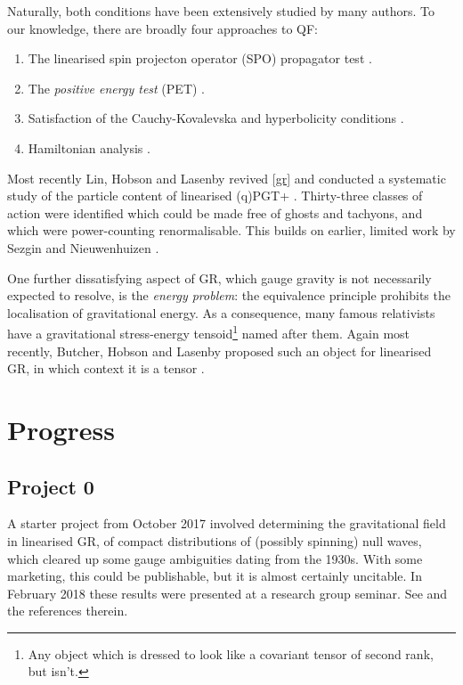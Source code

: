 \documentclass[twoside]{report}
\begin{document}
\begin{multicols}{2}
Naturally, both conditions have been extensively studied by many authors. To our knowledge, there are broadly four approaches to QF:
\begin{enumerate}[resume]
  \item\label{gr} The linearised spin projecton operator (SPO) propagator test \cite{2015CQGra..32e5012K,1980PhRvD..21.3269S}.
  \item\label{al} The \textit{positive energy test} (PET) \cite{2002IJMPD..11..747Y}.
  \item\label{be} Satisfaction of the Cauchy-Kovalevska and hyperbolicity conditions \cite{2002IJMPD..11..747Y}.
  \item\label{ga} Hamiltonian analysis \cite{2015CQGra..32e5012K,1990PhLA..151...12H,1984PhRvD..30.2508N,2018PhRvD..98b4014B,1998AcPPB..29..961C,1983PhRvD..28.2455B,1987PhRvD..35.3748B}. 
\end{enumerate}
Most recently Lin, Hobson and Lasenby revived \ref{gr} and conducted a systematic study of the particle content of linearised (q)PGT+ \cite{2019PhRvD..99f4001L,Lin2}. Thirty-three classes of action were identified which could be made free of ghosts and tachyons, and which were power-counting renormalisable. This builds on earlier, limited work by Sezgin and Nieuwenhuizen \cite{1980PhRvD..21.3269S}.

One further dissatisfying aspect of GR, which gauge gravity is not necessarily expected to resolve, is the \textit{energy problem}: the equivalence principle prohibits the localisation of gravitational energy. As a consequence, many famous relativists have a gravitational stress-energy tensoid\footnote{Any object which is dressed to look like a covariant tensor of second rank, but isn't.} named after them. Again most recently, Butcher, Hobson and Lasenby proposed such an object for linearised GR, in which context it is a tensor \cite{2014JPhCS.484a2011B,2012PhRvD..86h4012B,2012PhRvD..86h4013B}. 

\section{Progress}\label{progress}
\subsection{Project 0}\label{zer}
A starter project from October 2017 involved determining the gravitational field in linearised GR, of compact distributions of (possibly spinning) null waves, which cleared up some gauge ambiguities dating from the 1930s. With some marketing, this could be publishable, but it is almost certainly uncitable.
In February 2018 these results were presented \cite{sem} at a research group seminar. See \cite{lg} and the references therein.

\end{multicols}
\end{document}
